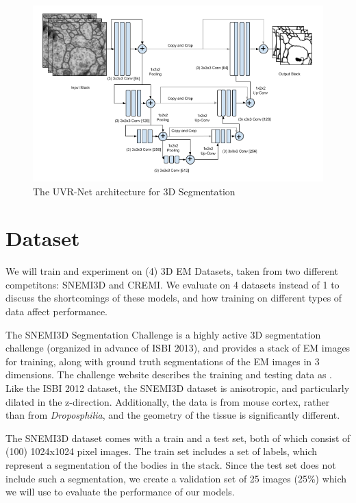 \begin{itemize}
	\begin{figure}
	\centering
	\includegraphics[width=\textwidth]{img/U-Net_3D.png}
	\caption{The UVR-Net architecture for 3D Segmentation}
	\label{fig:uvr-net}
	\end{figure}
\end{itemize}

\section{Dataset}

We will train and experiment on (4) 3D EM Datasets, taken from two different competitons: SNEMI3D and CREMI. We evaluate on 4 datasets instead of 1 to discuss the shortcomings of these models, and how training on different types of data affect performance.

The SNEMI3D Segmentation Challenge is a highly active 3D segmentation challenge (organized in advance of ISBI 2013), and provides a stack of EM images for training, along with ground truth segmentations of the EM images in 3 dimensions. The challenge website describes the training and testing data as \cite{Arganda-Carreras2013}. Like the ISBI 2012 dataset, the SNEMI3D dataset is anisotropic, and particularly dilated in the z-direction. Additionally, the data is from mouse cortex, rather than from \textit{Droposphilia}, and the geometry of the tissue is significantly different. 

The SNEMI3D dataset comes with a train and a test set, both of which consist of (100) 1024x1024 pixel images. The train set includes a set of labels, which represent a segmentation of the bodies in the stack. Since the test set does not include such a segmentation, we create a validation set of 25 images (25\%) which we will use to evaluate the performance of our models.

